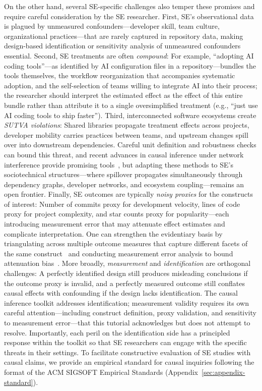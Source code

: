 On the other hand, several SE-specific challenges also temper these promises and require careful consideration by the SE researcher.
First, SE's observational data is plagued by unmeasured confounders---developer skill, team culture, organizational practices---that are rarely captured in repository data, making design-based identification or sensitivity analysis of unmeasured confounders essential.
Second, SE treatments are often \emph{compound}: For example, ``adopting AI coding tools''---as identified by AI configuration files in a repository---bundles the tools themselves, the workflow reorganization that accompanies systematic adoption, and the self-selection of teams willing to integrate AI into their process; the researcher should interpret the estimated effect as the effect of this entire bundle rather than attribute it to a single oversimplified treatment (e.g., ``just use AI coding tools to ship faster'').
Third, interconnected software ecosystems create \emph{SUTVA violations}: Shared libraries propagate treatment effects across projects, developer mobility carries practices between teams, and upstream changes spill over into downstream dependencies.
Careful unit definition and robustness checks can bound this threat, and recent advances in causal inference under network interference provide promising tools~\cite{savje2021average, forastiere2021identification}, but adapting these methods to SE's sociotechnical structures---where spillover propagates simultaneously through dependency graphs, developer networks, and ecosystem coupling---remains an open frontier.
Finally, SE outcomes are typically \emph{noisy proxies} for the constructs of interest: Number of commits proxy for development velocity, lines of code proxy for project complexity, and star counts proxy for popularity---each introducing measurement error that may attenuate effect estimates and complicate interpretation.
One can strengthen the evidentiary basis by triangulating across multiple outcome measures that capture different facets of the same construct~\cite{lawlor2016triangulation} and conducting measurement error analysis to bound attenuation bias~\cite{hausman2001mismeasured}.
More broadly, \emph{measurement} and \emph{identification} are orthogonal challenges: A perfectly identified design still produces misleading conclusions if the outcome proxy is invalid, and a perfectly measured outcome still conflates causal effects with confounding if the design lacks identification.
The causal inference toolkit addresses identification; measurement validity requires its own careful attention---including construct definition, proxy validation, and sensitivity to measurement error---that this tutorial acknowledges but does not attempt to resolve.
Importantly, each peril on the identification side has a principled response within the toolkit so that SE researchers can engage with the specific threats in their settings.
To facilitate constructive evaluation of SE studies with causal claims, we provide an empirical standard for causal inquiries following the format of the ACM SIGSOFT Empirical Standards (Appendix~\ref{sec:appendix-standard}).


